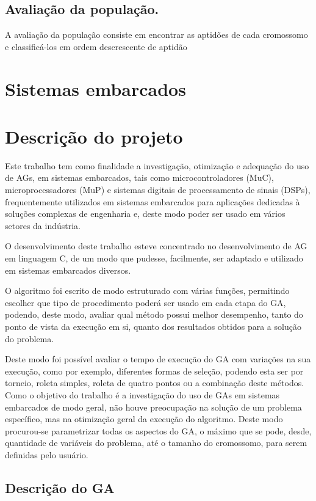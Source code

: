\documentclass[
    12pt,               %
    twoside,            %
    a4paper,            %
    english,            %
    french,             %
    spanish,            %
    brazil,             %
    ]{abntex2}
\begin{document}
\section{Avaliação da população.}

  A avaliação da população consiste em encontrar as aptidões de cada cromossomo e classificá-los em ordem descrescente de aptidão

\chapter{Sistemas embarcados}

\chapter{Descrição do projeto}

 Este trabalho tem como finalidade a investigação, otimização e adequação do uso de AGs, em sistemas embarcados, tais como microcontroladores (MuC), microprocessadores (MuP) e sistemas digitais de processamento de sinais (DSPs), frequentemente utilizados em sistemas embarcados para aplicações dedicadas à soluções complexas de engenharia e, deste modo poder ser usado em vários setores da indústria.

 O desenvolvimento deste trabalho esteve concentrado no desenvolvimento de AG em linguagem C, de um modo que pudesse, facilmente, ser adaptado e utilizado em sistemas embarcados diversos.

 O algoritmo foi escrito de modo estruturado com várias funções, permitindo escolher que tipo de procedimento poderá ser usado em cada etapa do GA, podendo, deste modo, avaliar qual método possui melhor desempenho, tanto do ponto de vista da execução em si, quanto dos resultados obtidos para a solução do problema.

 Deste modo foi possível avaliar o tempo de execução do GA com variações na sua execução, como por exemplo, diferentes formas de seleção, podendo esta ser por torneio, roleta simples, roleta de quatro pontos ou a combinação deste métodos. Como o objetivo do trabalho é a investigação do uso de GAs em sistemas embarcados de modo geral, não houve preocupação na solução de um problema específico, mas na otimização geral da execução do algoritmo. Deste modo procurou-se parametrizar todas os aspectos do GA, o máximo que se pode, desde, quantidade de variáveis do problema, até o tamanho do cromossomo, para serem definidas pelo usuário.

\section{Descrição do GA}
\end{document}
